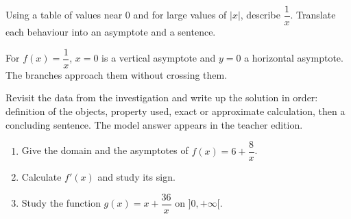 \begin{activite}
Using a table of values near $0$ and for large values of $|x|$, describe $\dfrac1x$. Translate each behaviour into an asymptote and a sentence.
\begin{center}\end{center}
\end{activite}

\begin{traceecrite}For $f(x)=\dfrac1x$, $x=0$ is a vertical asymptote and $y=0$ a horizontal asymptote. The branches approach them without crossing them.\end{traceecrite}

\begin{exemple}
Revisit the data from the investigation and write up the solution in order: definition of the objects, property used, exact or approximate calculation, then a concluding sentence. The model answer appears in the teacher edition.
\end{exemple}

\begin{exercice}[-- essential]
\begin{enumerate}\item Give the domain and the asymptotes of $f(x)=6+\dfrac{8}x$.\item Calculate $f'(x)$ and study its sign.\item Study the function $g(x)=x+\dfrac{36}x$ on $]0,+\infty[$.\end{enumerate}
\end{exercice}

